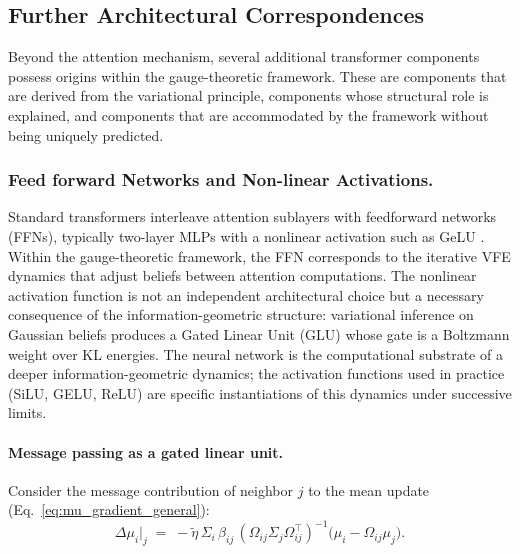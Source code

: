 \documentclass[twoside,11pt]{article}
\begin{document}
\subsection{Further Architectural Correspondences}
\label{sec:further_correspondences}

Beyond the attention mechanism, several additional transformer components possess origins within the gauge-theoretic framework. These are components that are derived from the variational principle, components whose structural role is explained, and components that are accommodated by the framework without being uniquely predicted.

\subsubsection{Feed forward Networks and Non-linear Activations.}
\label{sec:ffn_nonlinearity}

Standard transformers interleave attention sublayers with feedforward networks (FFNs), typically two-layer MLPs with a nonlinear activation such as GeLU \citep{hendrycks2016gaussian}. Within the gauge-theoretic framework, the FFN corresponds to the iterative VFE dynamics that adjust beliefs between attention computations. The nonlinear activation function is not an independent architectural choice but a necessary consequence of the information-geometric structure: variational inference on Gaussian beliefs produces a Gated Linear Unit (GLU) \citep{dauphin2017language} whose gate is a Boltzmann weight over KL energies. The neural network is the computational substrate of a deeper information-geometric dynamics; the activation functions used in practice (SiLU, GELU, ReLU) are specific instantiations of this dynamics under successive limits.

\paragraph{Message passing as a gated linear unit.}

Consider the message contribution of neighbor $j$ to the mean update (Eq.~\ref{eq:mu_gradient_general}):
%
\begin{equation}
\Delta\mu_i\big|_j \;=\; -\tilde{\eta}\,\Sigma_i\,\beta_{ij}\,(\Omega_{ij}\Sigma_j\Omega_{ij}^\top)^{-1}\bigl(\mu_i - \Omega_{ij}\mu_j\bigr).
\label{eq:glu_message}
\end{equation}
%
\end{document}

